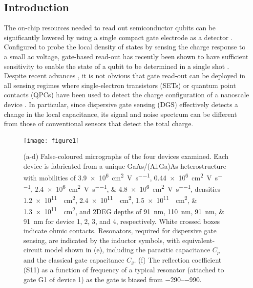 \subsection{Introduction}

The on-chip resources needed to read out semiconductor qubits can be significantly lowered by using a single compact gate electrode as a detector \cite{Colless_PRL}. Configured to probe the local density of states by sensing the charge response to a small ac voltage, gate-based read-out has recently been shown to have sufficient sensitivity to enable the state of a qubit to be determined in a single shot \cite{Nnano_dzurak}. Despite recent advances \cite{fernando1,PhysRevApplied.10.014018,PhysRevX.8.041032}, it is not obvious that gate read-out can be deployed in all sensing regimes where single-electron transistors (SETs) or quantum point contacts (QPCs) have been used to detect the charge configuration of a nanoscale device \cite{Reilly:2007ig,Devoret_schoel}. In particular, since dispersive gate sensing (DGS) effectively detects a change in the local capacitance, its signal and noise spectrum can be different from those of conventional sensors that detect the total charge.

\begin{figure}
\texttt{[image: figure1]}
\caption[Several qubit devices used to examine the anomalous dispersive readout signal, and equivalent circuit schematic]{\label{fig:pock_fig1} (a-d) False-coloured micrographs of the four devices examined. Each device is fabricated from a unique GaAs/(Al,Ga)As heterostructure with mobilities of \SIlist[list-units=single]{3.9e6;0.44e6;2.4e6;4.8e6}{\square\centi\meter\per\volt\per\second}, densities \SIlist[list-units = single]{1.2e11;2.4e11;1.5e11;1.3e11}{\per\square\centi\meter}, and 2DEG depths of \SIlist{91;110;91;91}{\nano\meter} for device 1, 2, 3, and 4, respectively. White crossed boxes indicate ohmic contacts. Resonators, required for dispersive gate sensing, are indicated by the inductor symbols, with equivalent-circuit model shown in (e), including the parasitic capacitance $C_p$ and the classical gate capacitance $C_g$. (f) The reflection coefficient (S11) as a function of frequency of a typical resonator (attached to gate G1 of device 1) as the gate is biased from \SIrange{-290}{-990}{\mv}.}
\end{figure}


